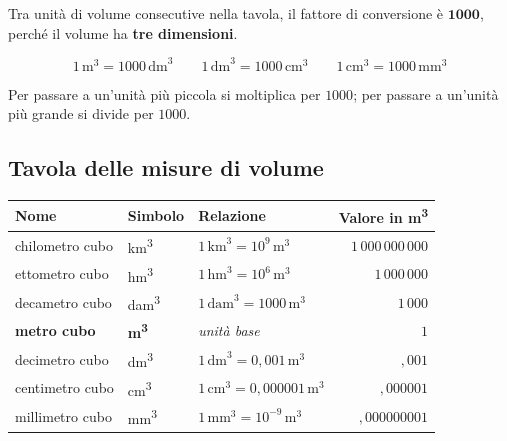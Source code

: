\begin{regola}
    Tra unità di volume consecutive nella tavola, il fattore di conversione è $\mathbf{1000}$, perché il volume ha \textbf{tre dimensioni}.

    \[
        1\,\text{m}^3 = 1000\,\text{dm}^3 \qquad 1\,\text{dm}^3 = 1000\,\text{cm}^3 \qquad 1\,\text{cm}^3 = 1000\,\text{mm}^3
    \]

    Per passare a un'unità più piccola si moltiplica per $1000$; per passare a un'unità più grande si divide per $1000$.
\end{regola}

\subsection{Tavola delle misure di volume}

\begin{center}
    \begin{tabular}{lllr}
        \toprule
        \textbf{Nome}       & \textbf{Simbolo}              & \textbf{Relazione}                        & \textbf{Valore in m\textsuperscript{3}} \\
        \midrule
        chilometro cubo     & km\textsuperscript{3}         & $1\,\text{km}^3 = 10^9\,\text{m}^3$       & $1\,000\,000\,000$                      \\
        ettometro cubo      & hm\textsuperscript{3}         & $1\,\text{hm}^3 = 10^6\,\text{m}^3$       & $1\,000\,000$                           \\
        decametro cubo      & dam\textsuperscript{3}        & $1\,\text{dam}^3 = 1000\,\text{m}^3$      & $1\,000$                                \\
        \textbf{metro cubo} & \textbf{m\textsuperscript{3}} & \textit{unità base}                       & $1$                                     \\
        decimetro cubo      & dm\textsuperscript{3}         & $1\,\text{dm}^3 = 0{,}001\,\text{m}^3$    & ${,}001$                                \\
        centimetro cubo     & cm\textsuperscript{3}         & $1\,\text{cm}^3 = 0{,}000001\,\text{m}^3$ & ${,}000001$                             \\
        millimetro cubo     & mm\textsuperscript{3}         & $1\,\text{mm}^3 = 10^{-9}\,\text{m}^3$    & ${,}000000001$                          \\
        \bottomrule
    \end{tabular}
\end{center}

